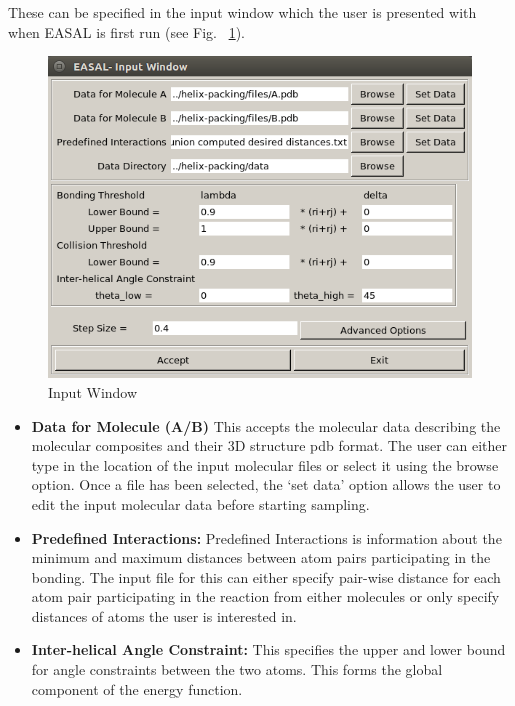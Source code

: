 \documentclass[10pt]{article}
\begin{document}
These can be specified in the input window which the user is presented with when EASAL is first run (see Fig. ~\ref{Input}).

\begin{figure}[h]
\centering
\includegraphics[scale=0.5] {fig/Input.png}
\caption{Input Window}
\label{Input}
\end{figure}

\begin{itemize}
\item \textbf{Data for Molecule (A/B)} This accepts the molecular data
		describing the molecular composites and their 3D structure pdb format.
		The user can either type in the location of the input molecular files
		or select it using the browse option. Once a file has been selected,
		the `set data' option allows the user to edit the input molecular data
		before starting sampling.
\item \textbf{Predefined Interactions:} Predefined Interactions is information
		about the minimum and maximum distances between atom pairs
		participating in the bonding. The input file for this can either
		specify pair-wise distance for each atom pair participating in the
		reaction from either molecules or only specify distances of atoms the
		user is interested in.
\item \textbf{Inter-helical Angle Constraint:} This specifies the upper and
		lower bound for angle constraints between the two atoms. This forms
		the global component of the energy function.

\end{itemize}
\end{document}
